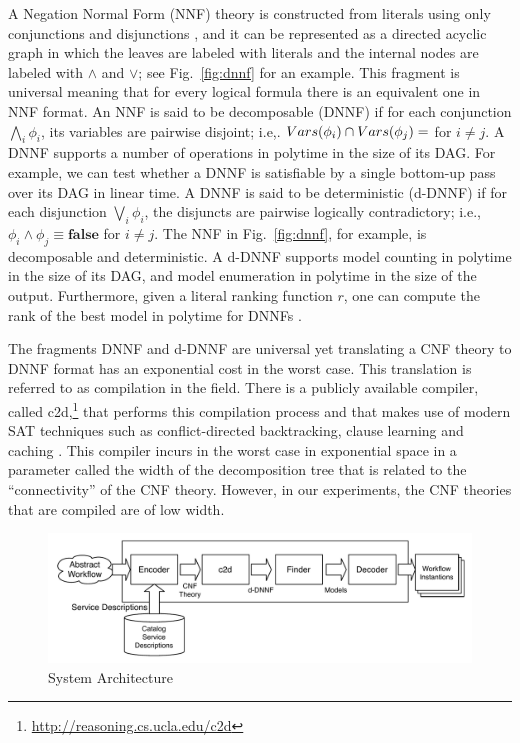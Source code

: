 \documentclass{llncs}
\begin{document}
A Negation Normal Form (NNF) theory is constructed from literals using only conjunctions
and disjunctions \cite{barwise:handbook}, and it can be represented as a directed
acyclic graph in which the leaves are labeled with literals and the internal nodes
are labeled with $\land$ and $\lor$; see Fig.~\ref{fig:dnnf} for an example.
This fragment is universal meaning that for every logical formula there is an
equivalent one in NNF format.
An NNF is said to be decomposable (DNNF) \cite{darwiche:d-dnnfs} if for each conjunction
$\bigwedge_i\phi_i$, its variables are pairwise disjoint; i.e,.
$Vars(\phi_i)\cap Vars(\phi_j)=\empty$ for $i\neq j$.
A DNNF supports a number of operations in polytime in the size of its DAG.
For example, we can test whether a DNNF is satisfiable by a single bottom-up pass
over its DAG in linear time.
A DNNF is said to be deterministic (d-DNNF) \cite{darwiche:d-dnnfs} if for each
disjunction $\bigvee_i\phi_i$, the disjuncts are pairwise logically contradictory;
i.e., $\phi_i\land\phi_j\equiv\textbf{false}$ for $i\neq j$.
The NNF in Fig.~\ref{fig:dnnf}, for example, is decomposable and deterministic.
A d-DNNF supports model counting in polytime in the size of its DAG, and model
enumeration in polytime in the size of the output.
Furthermore, given a literal ranking function $r$, one can compute the rank
of the best model in polytime for DNNFs \cite{darwiche:weighted}.

The fragments DNNF and d-DNNF are universal yet translating a CNF theory 
to DNNF format has an exponential cost in the worst case. This translation
is referred to as compilation in the field. There is a publicly available
compiler, called c2d,\footnote{\url{http://reasoning.cs.ucla.edu/c2d}}
that performs this compilation process and that makes
use of modern SAT techniques such as conflict-directed backtracking,
clause learning and caching \cite{darwiche:compiler}.
This compiler incurs in the worst case in exponential space in a parameter
called the width of the decomposition tree that is related to the ``connectivity''
of the CNF theory. However, in our experiments, the CNF theories that are
compiled are of low width.


\begin{figure}[t]
\centering
\includegraphics[width=.9\textwidth]{architecture}
\caption{System Architecture}
\label{fig:architecture}
\end{figure}
\end{document}
